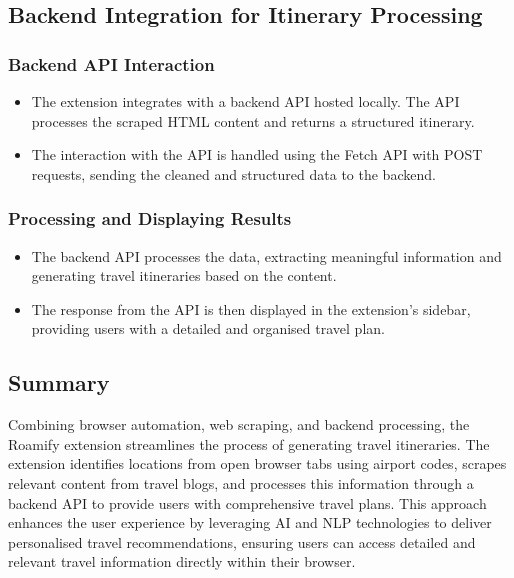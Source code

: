 \documentclass[conference]{IEEEtran}
\begin{document}
    \subsection{Backend Integration for Itinerary Processing}

        \subsubsection{Backend API Interaction}
        \begin{itemize}
            \item The extension integrates with a backend API hosted locally. The API processes the scraped HTML content and returns a structured itinerary.
            \item The interaction with the API is handled using the Fetch API with POST requests, sending the cleaned and structured data to the backend.
        \end{itemize}

        \subsubsection{Processing and Displaying Results}
        \begin{itemize}
            \item The backend API processes the data, extracting meaningful information and generating travel itineraries based on the content.
            \item The response from the API is then displayed in the extension’s sidebar, providing users with a detailed and organised travel plan.
        \end{itemize}

    \subsection{Summary}
        Combining browser automation, web scraping, and backend processing, the Roamify extension streamlines the process of generating travel itineraries. The extension identifies locations from open browser tabs using airport codes, scrapes relevant content from travel blogs, and processes this information through a backend API to provide users with comprehensive travel plans. This approach enhances the user experience by leveraging AI and NLP technologies to deliver personalised travel recommendations, ensuring users can access detailed and relevant travel information directly within their browser.
\end{document}
